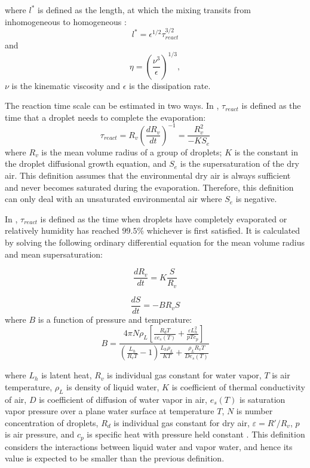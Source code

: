 where $l^{*}$ is defined as the length, at which the mixing transits from inhomogeneous 
to homogeneous \cite{Lehmann2009}:
\[
l^{*}=\epsilon^{1/2}\tau_{react}^{3/2}
\]
and 
\[
\eta = (\frac{\nu^3}{\epsilon})^{1/3}, 
\]
$\nu$ is the kinematic viscosity and $\epsilon$ is the dissipation rate.

The reaction time scale can be estimated in two ways. 
In \cite{Andrejczuk2009, Burnet2007Observational}, $\tau_{react}$ is defined as the time that a droplet needs 
to complete the evaporation:
\begin{equation}
\tau_{react} = R_v(\frac{dR_v}{dt})^{-1} = \frac{R_v^2}{-KS_e}
\end{equation}
where $R_v$ is the mean volume radius of a group of droplets; $K$ is the constant in the 
droplet diffusional growth equation, and $S_e$ is the supersaturation of the dry air. 
This definition assumes that the environmental dry air is always 
sufficient and never becomes saturated during the evaporation. Therefore, this definition 
can only deal with an unsaturated environmental air where $S_e$ is negative.

In \cite{Lehmann2009, Lu2013}, $\tau_{react}$ is defined as the time when droplets have completely 
evaporated or relatively humidity has reached $99.5\%$ whichever is first satisfied. It is calculated 
by solving the following ordinary differential equation for the mean volume radius and mean supersaturation:

\begin{equation}
\frac{dR_{v}}{dt}=K\frac{S}{R_{v}}\label{eq:DiffR}
\end{equation}

\begin{equation}
\frac{dS}{dt}=-BR_{v}S\label{eq:DiffSuper}
\end{equation}
where $B$ is a function of pressure and temperature:
\begin{equation}
B = 
\frac{4\pi N\rho_L[\frac{R_dT}{\varepsilon e_s(T)} + \frac{\varepsilon L^2_h}{pTc_p}]} 
{(\frac{L_h}{R_vT}-1)\frac{L_h\rho_L}{KT} + \frac{\rho_L R_v T}{De_s(T)}}
\end{equation}

where $L_h$ is latent heat, $R_v$ is individual gas constant for water vapor,
$T$ is air temperature, $\rho_L$ is density of liquid water, $K$ is coefficient
of thermal conductivity of air, $D$ is coefficient of diffusion of water vapor
in air, $e_s(T)$ is saturation vapor pressure over a plane water surface at
temperature $T$, $N$ is number concentration of droplets, $R_d$ is individual
gas constant for dry air, $\varepsilon = R'/R_v$, $p$ is air pressure, and
$c_p$ is specific heat with pressure held constant \cite{Lu2011}.
This definition considers the interactions between liquid water and vapor water, 
and hence its value is expected to be smaller than the previous definition. 

